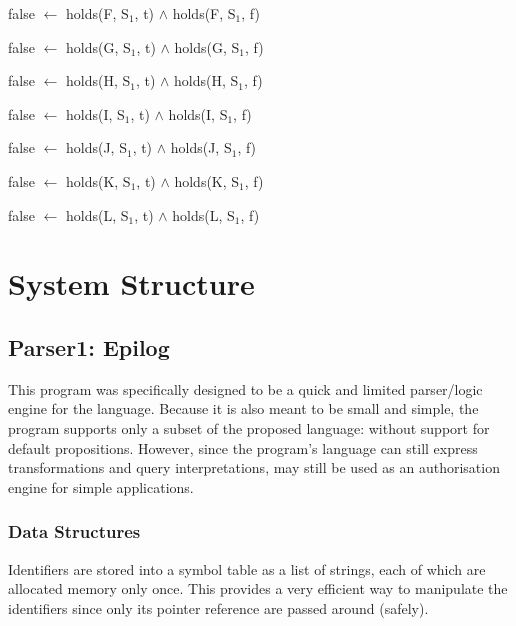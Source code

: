 \documentclass[a4paper]{article}
\begin{document}
\begin{itemize}
\begin{list}{}{Complementary Rules}
                false $\leftarrow$ holds(F, S$_{1}$, t) $\land$ holds(F, S$_{1}$, f)
              \item
                false $\leftarrow$ holds(G, S$_{1}$, t) $\land$ holds(G, S$_{1}$, f)
              \item
                false $\leftarrow$ holds(H, S$_{1}$, t) $\land$ holds(H, S$_{1}$, f)
              \item
                false $\leftarrow$ holds(I, S$_{1}$, t) $\land$ holds(I, S$_{1}$, f)
              \item
                false $\leftarrow$ holds(J, S$_{1}$, t) $\land$ holds(J, S$_{1}$, f)
              \item
                false $\leftarrow$ holds(K, S$_{1}$, t) $\land$ holds(K, S$_{1}$, f)
              \item
                false $\leftarrow$ holds(L, S$_{1}$, t) $\land$ holds(L, S$_{1}$, f)
            \end{list}


        \end{itemize}



  \section{System Structure}

    \subsection{Parser1: Epilog}

      This program was specifically designed to be a quick and limited 
      parser/logic engine for the language. Because it is also meant to
      be small and simple, the program supports only a subset of the
      proposed language: without support for default propositions. However,
      since the program's language can still express transformations and query
      interpretations, may still be used as an authorisation engine for simple
      applications.

      \subsubsection{Data Structures}

        Identifiers are stored into a symbol table as a list of strings, each
        of which are allocated memory only once. This provides a very
        efficient way to manipulate the identifiers since only its pointer
        reference are passed around (safely).
\end{document}

